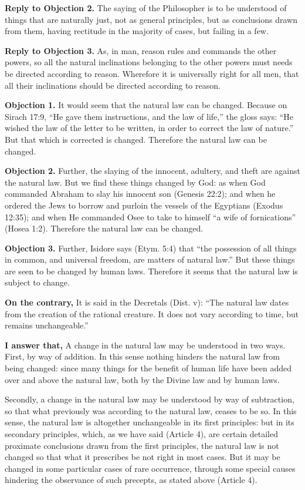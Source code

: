 \textbf{Reply to Objection 2.} The saying of the Philosopher is to be understood of things that are naturally just, not as general principles, but as conclusions drawn from them, having rectitude in the majority of cases, but failing in a few.

\textbf{Reply to Objection 3.} As, in man, reason rules and commands the other powers, so all the natural inclinations belonging to the other powers must needs be directed according to reason. Wherefore it is universally right for all men, that all their inclinations should be directed according to reason.


\textbf{Objection 1.} It would seem that the natural law can be changed. Because on Sirach 17:9, ``He gave them instructions, and the law of life,'' the gloss says: ``He wished the law of the letter to be written, in order to correct the law of nature.'' But that which is corrected is changed. Therefore the natural law can be changed.

\textbf{Objection 2.} Further, the slaying of the innocent, adultery, and theft are against the natural law. But we find these things changed by God: as when God commanded Abraham to slay his innocent son (Genesis 22:2); and when he ordered the Jews to borrow and purloin the vessels of the Egyptians (Exodus 12:35); and when He commanded Osee to take to himself ``a wife of fornications'' (Hosea 1:2). Therefore the natural law can be changed.

\textbf{Objection 3.} Further, Isidore says (Etym. 5:4) that ``the possession of all things in common, and universal freedom, are matters of natural law.'' But these things are seen to be changed by human laws. Therefore it seems that the natural law is subject to change.

\textbf{On the contrary,} It is said in the Decretals (Dist. v): ``The natural law dates from the creation of the rational creature. It does not vary according to time, but remains unchangeable.''

\textbf{I answer that,} A change in the natural law may be understood in two ways. First, by way of addition. In this sense nothing hinders the natural law from being changed: since many things for the benefit of human life have been added over and above the natural law, both by the Divine law and by human laws.

Secondly, a change in the natural law may be understood by way of subtraction, so that what previously was according to the natural law, ceases to be so. In this sense, the natural law is altogether unchangeable in its first principles: but in its secondary principles, which, as we have said (Article 4), are certain detailed proximate conclusions drawn from the first principles, the natural law is not changed so that what it prescribes be not right in most cases. But it may be changed in some particular cases of rare occurrence, through some special causes hindering the observance of such precepts, as stated above (Article 4).

